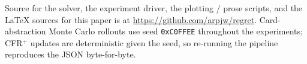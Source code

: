 Source for the solver, the experiment driver, the plotting / prose
scripts, and the \LaTeX{} sources for this paper is at
\url{https://github.com/arpjw/regret}. Card-abstraction Monte Carlo
rollouts use seed \texttt{0xC0FFEE} throughout the experiments; CFR$^+$
updates are deterministic given the seed, so re-running the pipeline
reproduces the JSON byte-for-byte.
